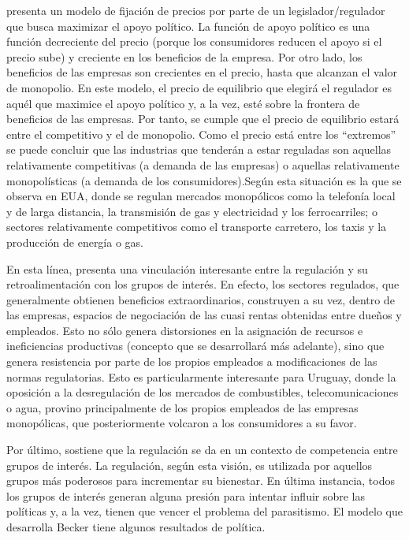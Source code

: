 \documentclass[
  12pt,
  spanish,
]{book}
\begin{document}
\citet{Peltzman1976} presenta un modelo de fijación de precios por parte de un legislador/regulador que busca maximizar el apoyo político. La función de apoyo político es una función decreciente del precio (porque los consumidores reducen el apoyo si el precio sube) y creciente en los beneficios de la empresa. Por otro lado, los beneficios de las empresas son crecientes en el precio, hasta que alcanzan el valor de monopolio. En este modelo, el precio de equilibrio que elegirá el regulador es aquél que maximice el apoyo político y, a la vez, esté sobre la frontera de beneficios de las empresas. Por tanto, se cumple que el precio de equilibrio estará entre el competitivo y el de monopolio. Como el precio está entre los ``extremos'' se puede concluir que las industrias que tenderán a estar reguladas son aquellas relativamente competitivas (a demanda de las empresas) o aquellas relativamente monopolísticas (a demanda de los consumidores).Según \citet{Viscusi2005} esta situación es la que se observa en EUA, donde se regulan mercados monopólicos como la telefonía local y de larga distancia, la transmisión de gas y electricidad y los ferrocarriles; o sectores relativamente competitivos como el transporte carretero, los taxis y la producción de energía o gas.

En esta línea, \citet{Noll1989} presenta una vinculación interesante entre la regulación y su retroalimentación con los grupos de interés. En efecto, los sectores regulados, que generalmente obtienen beneficios extraordinarios, construyen a su vez, dentro de las empresas, espacios de negociación de las cuasi rentas obtenidas entre dueños y empleados. Esto no sólo genera distorsiones en la asignación de recursos e ineficiencias productivas (concepto que se desarrollará más adelante), sino que genera resistencia por parte de los propios empleados a modificaciones de las normas regulatorias. Esto es particularmente interesante para Uruguay, donde la oposición a la desregulación de los mercados de combustibles, telecomunicaciones o agua, provino principalmente de los propios empleados de las empresas monopólicas, que posteriormente volcaron a los consumidores a su favor.

Por último, \citet{Becker1983} sostiene que la regulación se da en un contexto de competencia entre grupos de interés. La regulación, según esta visión, es utilizada por aquellos grupos más poderosos para incrementar su bienestar. En última instancia, todos los grupos de interés generan alguna presión para intentar influir sobre las políticas y, a la vez, tienen que vencer el problema del parasitismo. El modelo que desarrolla Becker tiene algunos resultados de política.
\end{document}
